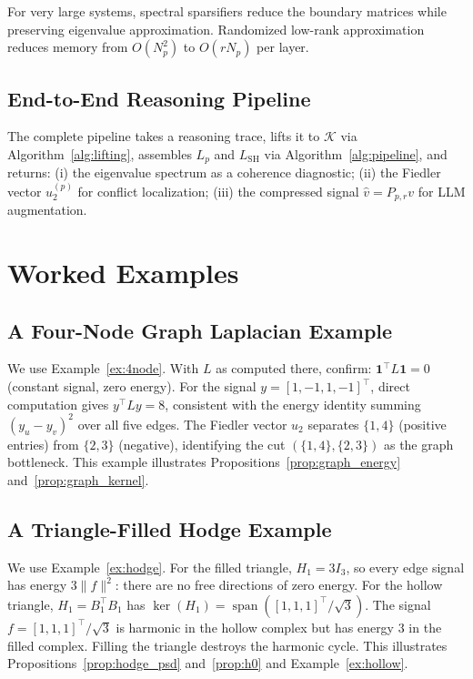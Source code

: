 \documentclass[11pt]{article}
\theoremstyle{definition}
\theoremstyle{remark}
\newcommand{\LSH}{L_{\mathrm{SH}}}
\newcommand{\Pp}{P_{p,r}}
\newcommand{\vhat}{\hat{v}}
\newcommand{\calK}{\mathcal{K}}
\DeclareMathOperator{\spn}{span}
\begin{document}
For very large systems, spectral sparsifiers reduce the boundary matrices while
preserving eigenvalue approximation. Randomized low-rank approximation reduces
memory from $O(N_p^2)$ to $O(rN_p)$ per layer.

\subsection{End-to-End Reasoning Pipeline}

The complete pipeline takes a reasoning trace, lifts it to $\calK$ via
Algorithm~\ref{alg:lifting}, assembles $L_p$ and $\LSH$ via
Algorithm~\ref{alg:pipeline}, and returns: (i) the eigenvalue spectrum as a
coherence diagnostic; (ii) the Fiedler vector $u_2^{(p)}$ for conflict
localization; (iii) the compressed signal $\vhat = \Pp v$ for LLM augmentation.

\FigureAEight


\section{Worked Examples}
\label{sec:examples}

\subsection{A Four-Node Graph Laplacian Example}

We use Example~\ref{ex:4node}. With $L$ as computed there, confirm:
$\mathbf{1}^\top L\mathbf{1}=0$ (constant signal, zero energy). For the signal
$y=[1,-1,1,-1]^\top$, direct computation gives $y^\top Ly = 8$, consistent
with the energy identity summing $(y_u-y_v)^2$ over all five edges. The Fiedler
vector $u_2$ separates $\{1,4\}$ (positive entries) from $\{2,3\}$ (negative),
identifying the cut $(\{1,4\},\{2,3\})$ as the graph bottleneck. This example
illustrates Propositions~\ref{prop:graph_energy} and~\ref{prop:graph_kernel}.

\subsection{A Triangle-Filled Hodge Example}

We use Example~\ref{ex:hodge}. For the filled triangle, $H_1=3I_3$, so every
edge signal has energy $3\|f\|^2$: there are no free directions of zero energy.
For the hollow triangle, $H_1=B_1^\top B_1$ has $\ker(H_1)=\spn([1,1,1]^\top/
\sqrt{3})$. The signal $f=[1,1,1]^\top/\sqrt{3}$ is harmonic in the hollow
complex but has energy $3$ in the filled complex. Filling the triangle destroys
the harmonic cycle. This illustrates Propositions~\ref{prop:hodge_psd}
and~\ref{prop:h0} and Example~\ref{ex:hollow}.
\end{document}
